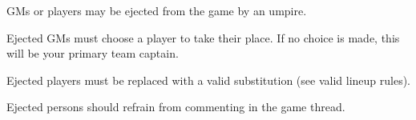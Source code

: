 \begin{deepEnumerate}
\begin{deepEnumerate}
		\item GMs or players may be ejected from the game by an umpire.
		\begin{deepEnumerate}
			\item Ejected GMs must choose a player to take their place. If no choice is made, this will be your primary team captain.
			\item Ejected players must be replaced with a valid substitution (see valid lineup rules).
			\item Ejected persons should refrain from commenting in the game thread.
		\end{deepEnumerate}
	\end{deepEnumerate}
\end{deepEnumerate}
